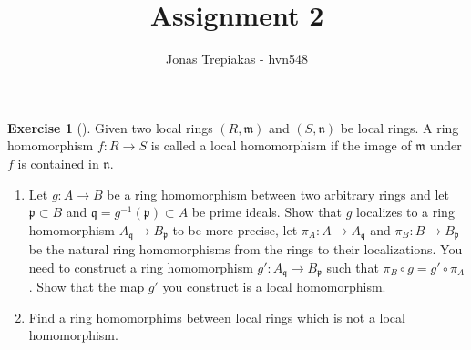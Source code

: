 \documentclass[reqno]{amsart}
\title{Assignment 2}
\author{Jonas Trepiakas - hvn548}
\date{}
\theoremstyle{definition}
\newtheorem{exercise}[theorem]{Exercise}
\theoremstyle{remark}
\begin{document}
\maketitle
    \begin{exercise}[]
        Given two local rings $\left( R,
        \mathfrak{m} \right) $ and
        $\left( S, \mathfrak{n} \right) $ be local rings.
        A ring homomorphism
        $f \colon R \to S$ is called a local
        homomorphism if the image of
        $\mathfrak{m}$ under $f$ is contained in
        $\mathfrak{n}$.
        \begin{enumerate}
            \item Let $g \colon A \to B$ be a ring
                homomorphism between two arbitrary
                rings and let 
                $\mathfrak{p} \subset B$ and
                $\mathfrak{q} = g^{-1}(\mathfrak{p}) \subset A$ be
                prime ideals. Show that
                $g$ localizes to a ring homomorphism
                $A_{\mathfrak{q}} \to 
                B_{\mathfrak{p}}$ to be more precise, let
                $\pi_{A} \colon A \to A_{\mathfrak{q}}$ 
                and $\pi_{B} \colon B \to 
                B_{\mathfrak{p}}$ be the natural ring
                homomorphisms from the
                rings to their localizations. You need
                to construct a ring homomorphism
                $g' \colon
                A_{\mathfrak{q}} \to 
                B_{\mathfrak{p}}$ such that
                $\pi_{B} \circ g = g' \circ \pi_A$. Show that
                the map $g'$ you construct is a local
                homomorphism.
            \item Find a ring homomorphims between
                local rings which is not a local
                homomorphism.
        \end{enumerate}
    \end{exercise}
\end{document}
